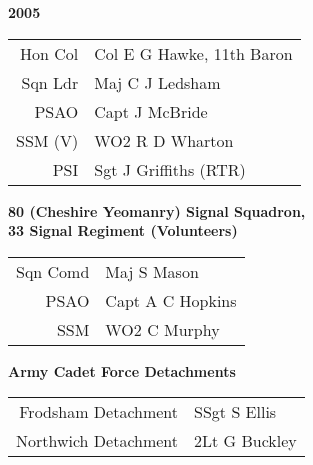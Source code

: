 \begin{center}
  \Huge
  \textbf{2005}
\end{center}

\begin{center}
  \small
  \begin{tabular}{rl}
    Hon Col & Col E G Hawke, 11th Baron \\
    Sqn Ldr & Maj C J Ledsham \\
    PSAO & Capt J McBride \\
    SSM (V) & WO2 R D Wharton \\
    PSI & Sgt J Griffiths (RTR) \\
  \end{tabular}
\end{center}

\begin{center}
  \Large
  \textbf{80 (Cheshire Yeomanry) Signal Squadron, \\ 33 Signal Regiment (Volunteers)}
\end{center}

\begin{center}
  \small
  \begin{tabular}{rl}
    Sqn Comd & Maj S Mason \\
    PSAO & Capt A C Hopkins \\
    SSM & WO2 C Murphy \\
  \end{tabular}
\end{center}

\begin{center}
  \Large
  \textbf{Army Cadet Force Detachments}
\end{center}

\begin{center}
  \small
  \begin{tabular}{rl}
    Frodsham Detachment & SSgt S Ellis \\
    Northwich Detachment & 2Lt G Buckley \\
  \end{tabular}
\end{center}

\vspace{50mm}

\pagebreak

